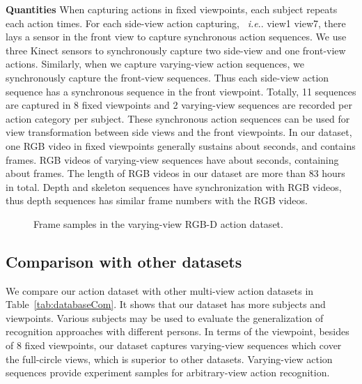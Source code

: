 \documentclass[journal]{IEEEtran}
\makeatletter
\DeclareRobustCommand\onedot{\futurelet\@let@token\@onedot}
\def\@onedot{\ifx\@let@token.\else.\null\fi\xspace}
\def\ie{\emph{i.e}\onedot} \def\Ie{\emph{I.e}\onedot}
\makeatother
\begin{document}
\textbf{Quantities} When capturing actions in fixed viewpoints, each subject repeats each action  times. For each side-view action capturing, ~\ie view1  view7, there lays a sensor in the front view to capture synchronous action sequences. We use three Kinect sensors to synchronously capture two side-view and one front-view actions. Similarly, when we capture varying-view action sequences, we synchronously capture the front-view sequences. Thus each side-view action sequence has a synchronous sequence in the front viewpoint. Totally, 11 sequences are captured in 8 fixed viewpoints and 2 varying-view sequences are recorded per action category per subject. These synchronous action sequences can be used for view transformation between side views and the front viewpoints. In our dataset, one RGB video in fixed viewpoints generally sustains about  seconds, and contains  frames. RGB videos of varying-view sequences have about  seconds, containing about  frames. The length of RGB videos in our dataset are more than 83 hours in total. Depth and skeleton sequences have synchronization with RGB videos, thus depth sequences has similar frame numbers with the RGB videos.
\begin{figure*}
 \begin{center}
 \hspace{1in}
 \caption{ Frame samples in the varying-view RGB-D action dataset. }
 \label{fig:DBexample} \end{center}
 \end{figure*}

\subsection{Comparison with other datasets}
We compare our action dataset with other multi-view action datasets in Table~\ref{tab:databaseCom}. It shows that our dataset has more subjects and viewpoints. Various subjects may be used to evaluate the generalization of recognition approaches with different persons. In terms of the viewpoint, besides of 8 fixed viewpoints, our dataset captures varying-view sequences which cover the  full-circle views, which is superior to other datasets. Varying-view action sequences provide experiment samples for arbitrary-view action recognition.
\end{document}
